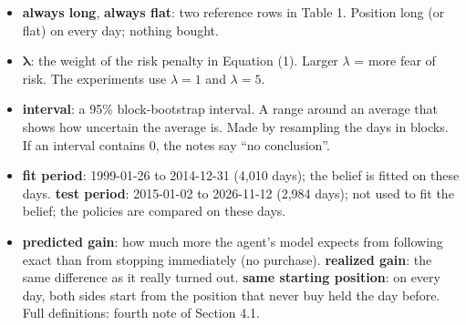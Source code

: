 \documentclass{article}
\newenvironment{pts}{\begin{itemize}[nosep,leftmargin=1.15em,topsep=1pt]}{\end{itemize}}
\begin{document}
\begin{pts}
\begin{itemize}[nosep,leftmargin=1.15em,topsep=0pt]
  \item \textbf{exact}: plans both purchase decisions of the day together (Equation (5)).
  \end{itemize}
\item \textbf{always long}, \textbf{always flat}: two reference rows in Table 1. Position long (or flat) on every day; nothing bought.
\item $\boldsymbol{\lambda}$: the weight of the risk penalty in Equation (1). Larger $\lambda$ = more fear of risk. The experiments use $\lambda=1$ and $\lambda=5$.
\item \textbf{interval}: a 95\% block-bootstrap interval. A range around an average that shows how uncertain the average is. Made by resampling the days in blocks. If an interval contains 0, the notes say ``no conclusion''.
\item \textbf{fit period}: 1999-01-26 to 2014-12-31 (4{,}010 days); the belief is fitted on these days. \textbf{test period}: 2015-01-02 to 2026-11-12 (2{,}984 days); not used to fit the belief; the policies are compared on these days.
\item \textbf{predicted gain}: how much more the agent's model expects from following exact than from stopping immediately (no purchase). \textbf{realized gain}: the same difference as it really turned out. \textbf{same starting position}: on every day, both sides start from the position that never buy held the day before. Full definitions: fourth note of Section 4.1.
\end{pts}
\end{document}
